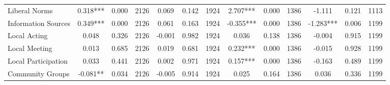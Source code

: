 \begin{tabular}{l*{12}{c}}
 Liberal Norms &        0.318*** &        0.000 & 2126    &        0.069 &        0.142 & 1924    &        2.707*** &        0.000 & 1386 &       -1.111 &        0.121 & 1113 \\ 

 Information Sources &        0.349*** &        0.000 & 2126    &        0.061 &        0.163 & 1924    &       -0.355*** &        0.000 & 1386 &       -1.283*** &        0.006 & 1199 \\ 

 Local Acting &        0.048 &        0.326 & 2126    &       -0.001 &        0.982 & 1924    &        0.036 &        0.138 & 1386 &       -0.004 &        0.915 & 1199 \\ 

 Local Meeting &        0.013 &        0.685 & 2126    &        0.019 &        0.681 & 1924    &        0.232*** &        0.000 & 1386 &       -0.015 &        0.928 & 1199 \\ 

 Local Participation &        0.033 &        0.441 & 2126    &        0.002 &        0.971 & 1924    &        0.157*** &        0.000 & 1386 &       -0.163 &        0.489 & 1199 \\ 

 Community Groups &       -0.081** &        0.034 & 2126    &       -0.005 &        0.914 & 1924    &        0.025 &        0.164 & 1386 &        0.036 &        0.336 & 1199 \\ 

\hline \end{tabular}
